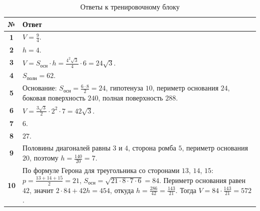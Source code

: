 \documentclass[a4paper,12pt]{article}
\newcommand{\ds}{\displaystyle}
\newcommand{\Area}{S}
\newcommand{\Vol}{V}
\begin{document}
\begin{table}[h!]
\centering
\caption{Ответы к тренировочному блоку}
\begin{tabularx}{\linewidth}{>{\bfseries}c X}
\toprule
№ & Ответ \\
\midrule
1 & $\ds \Vol=\frac{9}{4}$. \\

2 & $\ds h=4$. \\

3 & $\ds \Vol=\Area_{\text{осн}}\cdot h=\frac{4^2\sqrt{3}}{4}\cdot 6=24\sqrt{3}$. \\

4 & $\ds \Area_{\text{полн}}=62$. \\

5 & Основание: $\ds \Area_{\text{осн}}=\frac{6\cdot 8}{2}=24$, гипотенуза $10$, периметр основания $24$, боковая поверхность $240$, полная поверхность $\ds 288$. \\

6 & $\ds \Vol=\frac{3\sqrt{3}}{2}\cdot 2^2\cdot 7=42\sqrt{3}$. \\

7 & $\ds 6$. \\

8 & $\ds 27$. \\

9 & Половины диагоналей равны $3$ и $4$, сторона ромба $5$, периметр основания $20$, поэтому $\ds h=\frac{140}{20}=7$. \\

10 & По формуле Герона для треугольника со сторонами $13$, $14$, $15$:
$\ds p=\frac{13+14+15}{2}=21$,
$\ds \Area_{\text{осн}}=\sqrt{21\cdot 8\cdot 7\cdot 6}=84$.
Периметр основания равен $42$, значит
$\ds 2\cdot 84+42h=454$,
откуда $\ds h=\frac{286}{42}=\frac{143}{21}$.
Тогда
$\ds \Vol=84\cdot \frac{143}{21}=572$. \\
\bottomrule
\end{tabularx}
\end{table}
\end{document}
